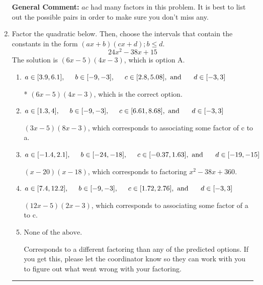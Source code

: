 \documentclass{extbook}[14pt]
\newcommand{\litem}[1]{\item #1

\rule{\textwidth}{0.4pt}}
\begin{document}
\begin{enumerate}
{\textbf{General Comment:} $ac$ had many factors in this problem. It is best to list out the possible pairs in order to make sure you don't miss any.
}
\litem{
Factor the quadratic below. Then, choose the intervals that contain the constants in the form $(ax+b)(cx+d); b \leq d.$
\[ 24x^{2} -38 x + 15 \]The solution is \( (6x -5)(4x -3) \), which is option A.\begin{enumerate}[label=\Alph*.]
\item \( a \in [3.9, 6.1], \hspace*{5mm} b \in [-9, -3], \hspace*{5mm} c \in [2.8, 5.08], \text{ and } \hspace*{5mm} d \in [-3, 3] \)

* $(6x -5)(4x -3)$, which is the correct option.
\item \( a \in [1.3, 4], \hspace*{5mm} b \in [-9, -3], \hspace*{5mm} c \in [6.61, 8.68], \text{ and } \hspace*{5mm} d \in [-3, 3] \)

 $(3x -5)(8x -3)$, which corresponds to associating some factor of c to a.
\item \( a \in [-1.4, 2.1], \hspace*{5mm} b \in [-24, -18], \hspace*{5mm} c \in [-0.37, 1.63], \text{ and } \hspace*{5mm} d \in [-19, -15] \)

 $(x -20)(x -18)$, which corresponds to factoring $x^{2} -38 x + 360$.
\item \( a \in [7.4, 12.2], \hspace*{5mm} b \in [-9, -3], \hspace*{5mm} c \in [1.72, 2.76], \text{ and } \hspace*{5mm} d \in [-3, 3] \)

 $(12x -5)(2x -3)$, which corresponds to associating some factor of a to c.
\item \( \text{None of the above.} \)

 Corresponds to a different factoring than any of the predicted options. If you get this, please let the coordinator know so they can work with you to figure out what went wrong with your factoring.
\end{enumerate}

}
\end{enumerate}
\end{document}
